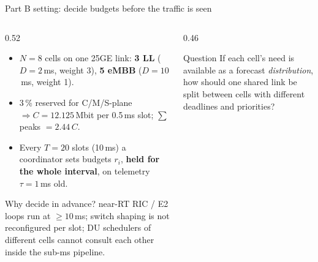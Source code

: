 \documentclass[aspectratio=169,10pt,xcolor={table,dvipsnames}]{beamer}
\begin{document}
\begin{frame}{Part B setting: decide budgets before the traffic is seen}
\begin{columns}[T]
\begin{column}{0.52\textwidth}
\small
\begin{itemize}
  \item $N = 8$ cells on one 25GE link: \textbf{3 LL} ($D = 2$\,ms, weight 3), \textbf{5 eMBB} ($D = 10$\,ms, weight 1).
  \item 3\,\% reserved for C/M/S-plane $\Rightarrow C = 12.125$\,Mbit per 0.5\,ms slot; $\sum$ peaks $= 2.44\,C$.
  \item Every $T = 20$ slots (10\,ms) a coordinator sets budgets $r_i$, \textbf{held for the whole interval}, on telemetry $\tau = 1$\,ms old.
\end{itemize}
\begin{block}{Why decide in advance?}
\footnotesize near-RT RIC / E2 loops run at $\ge 10$\,ms; switch shaping is not reconfigured per slot; DU schedulers of different cells cannot consult each other inside the sub-ms pipeline.
\end{block}
\end{column}
\begin{column}{0.46\textwidth}
\centering
{}
\vspace{0.6em}
\begin{alertblock}{Question}
\small If each cell's need is available as a forecast \emph{distribution}, how should one shared link be split between cells with different deadlines and priorities?
\end{alertblock}
\end{column}
\end{columns}
\end{frame}
\end{document}
